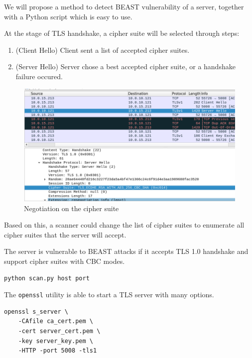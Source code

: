 \documentclass{acm_proc_article-sp}
\begin{document}
We will propose a method to detect BEAST vulnerability of a server, together with a
Python script which is easy to use.

At the stage of TLS handshake, a cipher suite will be selected through steps:

\begin{enumerate}
    \item (Client Hello) Client sent a list of accepted cipher suites.
    \item (Server Hello) Server chose a best accepted cipher suite, or a handshake failure occured.
\end{enumerate}

\begin{figure}[htb]
    \centering
    \includegraphics[keepaspectratio, width=\linewidth]{./figures/tls-handshake-cipher-spec.png}
    \caption{Negotiation on the cipher suite}
\end{figure}

Based on this, a scanner could change the list of cipher suites to enumerate all
cipher suites that the server will accept.

The server is vulnerable to BEAST attacks if it accepts TLS 1.0 handshake and support
cipher suites with CBC modes.

\begin{lstlisting}[language=bash]
python scan.py host port
\end{lstlisting}

The \texttt{openssl} utility is able to start a TLS server with many options.

\begin{lstlisting}
openssl s_server \
    -CAfile ca_cert.pem \
    -cert server_cert.pem \
    -key server_key.pem \
    -HTTP -port 5008 -tls1
\end{lstlisting}
\end{document}
